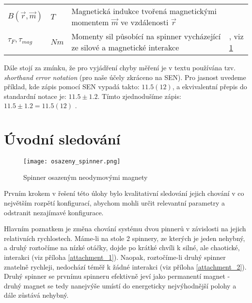 \documentclass[12pt, a4paper,
 twoside,        %
 openright
]{report}
\begin{document}
\begin{table}[!ht]
\begin{tabularx}{\textwidth}{m{} m{} p{} p{4cm} }
        $B(\vec{r}, \vec{m})$                & $T$                                                                          & Magnetická indukce tvořená magnetickými momentem $\vec{m}$ ve vzdálenosti $\vec{r}$         & \cite{magnetic_force, magnetic_torque} \\
        $\tau_F, \tau_{mag}$                 & $Nm$
                                             & Momenty sil působící na spinner vycházející ze silové a magnetické interakce & \cite{magnetic_torque,torque_def}, viz \ref{}                                                                                        \\
    \end{tabularx}
\end{table}

Dále stojí za zmínku, že pro vyjádření chyby měření je v textu používána tzv. \textit{shorthand error notation} \cite{shorthand_error_notation} (pro naše účely zkráceno na SEN). Pro jasnost uvedeme příklad, kde zápis pomocí SEN vypadá takto: $11.5(12)$, a ekvivalentní přepis do standardní notace je: $11.5 \pm 1.2$. Tímto zjednodušíme zápis: $11.5 \pm 1.2 = 11.5(12)$ \cite{shorthand_error_notation_stack_exchange}.

\chapter{Úvodní sledování}
\begin{wrapfigure}{r}{0.4\textwidth}
    \texttt{[image: osazeny\_spinner.png]}
    \centering
    \caption{Spinner osazeným neodymovými magnety}
    \label{fig:1spinner}
\end{wrapfigure}

Prvním krokem v řešení této úlohy bylo kvalitativní sledování jejich chování v co největším rozpětí konfigurací, abychom mohli určit relevantní parametry a odstranit nezajímavé konfigurace.

Hlavním poznatkem je změna chování systému dvou pinnerů v závislosti na jejich relativních rychlostech.
Máme-li na stole 2 spinnery, ze kterých je jeden nehybný, a druhý roztočíme na nízké otáčky, dojde po krátké chvíli k silné, ale chaotické, interakci (viz příloha \ref{attachment_1}).
Naopak, roztočíme-li druhý spinner znatelně rychleji, nedochází téměř k žádné interakci (viz příloha \ref{attachment_2}).
Druhý spinner se prvnímu spinneru efektivně jeví jako permanentí magnet - druhý magnet se tedy nanejvýše umístí do energeticky nejvýhodnější polohy a dále zůstává nehybný.
\end{document}
